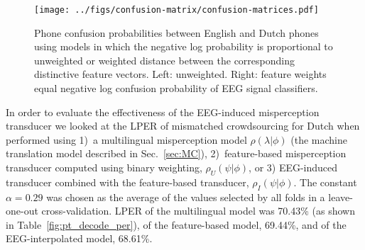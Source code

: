 \begin{figure}
  \centerline{
    \texttt{[image: ../figs/confusion-matrix/confusion-matrices.pdf]}
  }
    \vspace*{-0.3cm}
  \caption{Phone confusion probabilities between English and Dutch
    phones using models in which the negative log
    probability is proportional to unweighted or weighted
    distance between the corresponding
    distinctive feature vectors.  Left: unweighted.
    Right: feature weights equal negative log confusion
    probability of EEG signal classifiers.}
  \label{fig:eeg_confusions}
\end{figure}

In order to evaluate the effectiveness of the EEG-induced
misperception transducer we looked at the LPER of mismatched
crowdsourcing for Dutch when performed using 1)~a multilingual
misperception model $\rho(\lambda|\phi)$ (the machine translation
model described in Sec.~\ref{sec:MC}), 2)~feature-based misperception
transducer computed using binary weighting, $\rho_U(\psi|\phi)$, or 3)
EEG-induced transducer combined with the feature-based transducer,
$\rho_I(\psi|\phi)$.  {\color{blue} The constant $\alpha=0.29$ was
chosen as the average of the values selected by all folds in a
leave-one-out cross-validation.}  LPER of the multilingual model was
70.43\% {\color{blue} (as shown in Table~\ref{fig:pt_decode_per})}, of
the feature-based model, 69.44\%, and of the EEG-interpolated model,
68.61\%.



